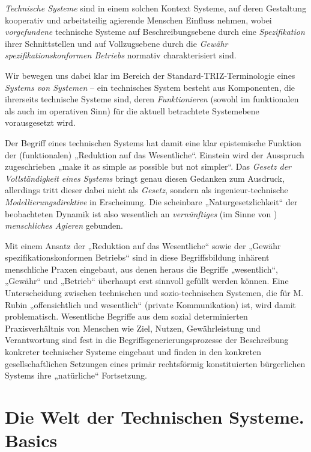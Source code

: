 \documentclass[11pt,a4paper]{article}
\begin{document}
\emph{Technische Systeme} sind in einem solchen Kontext Systeme, auf deren
Gestaltung kooperativ und arbeitsteilig agierende Menschen Einfluss nehmen,
wobei \emph{vorgefundene} technische Systeme auf Beschreibungsebene durch eine
\emph{Spezifikation} ihrer Schnittstellen und auf Vollzugsebene durch die
\emph{Gewähr spezifikationskonformen Betriebs} normativ charakterisiert sind.

Wir bewegen uns dabei klar im Bereich der Standard-TRIZ-Terminologie eines
\emph{Systems von Systemen} -- ein technisches System besteht aus Komponenten,
die ihrerseits technische Systeme sind, deren \emph{Funktionieren} (sowohl im
funktionalen als auch im operativen Sinn) für die aktuell betrachtete
Systemebene vorausgesetzt wird.

Der Begriff eines technischen Systems hat damit eine klar epistemische
Funktion der (funktionalen) „Reduktion auf das Wesentliche“.  Einstein wird
der Ausspruch zugeschrieben „make it as simple as possible but not
simpler“. Das \emph{Gesetz der Vollständigkeit eines Systems} bringt genau
diesen Gedanken zum Ausdruck, allerdings tritt dieser dabei nicht als
\emph{Gesetz}, sondern als ingenieur-technische \emph{Modellierungsdirektive}
in Erscheinung.  Die scheinbare „Naturgesetzlichkeit“ der beobachteten Dynamik
ist also wesentlich an \emph{vernünftiges} (im Sinne von \cite{Vernadsky1997})
\emph{menschliches Agieren} gebunden.

Mit einem Ansatz der „Reduktion auf das Wesentliche“ sowie der „Gewähr
spezifikationskonformen Betriebs“ sind in diese Begriffsbildung inhärent
menschliche Praxen eingebaut, aus denen heraus die Begriffe „wesentlich“,
„Gewähr“ und „Betrieb“ überhaupt erst sinnvoll gefüllt werden können.  Eine
Unterscheidung zwischen technischen und sozio-technischen Systemen, die für
M. Rubin „offensichtlich und wesentlich“ (private Kommunikation) ist, wird
damit problematisch. Wesentliche Begriffe aus dem sozial determinierten
Praxisverhältnis von Menschen wie Ziel, Nutzen, Gewährleistung und
Verantwortung sind fest in die Begriffsgenerierungsprozesse der Beschreibung
konkreter technischer Systeme eingebaut und finden in den konkreten
gesellschaftlichen Setzungen eines primär rechtsförmig konstituierten
bürgerlichen Systems ihre „natürliche“ Fortsetzung.

\section{Die Welt der Technischen Systeme. Basics}
\end{document}
